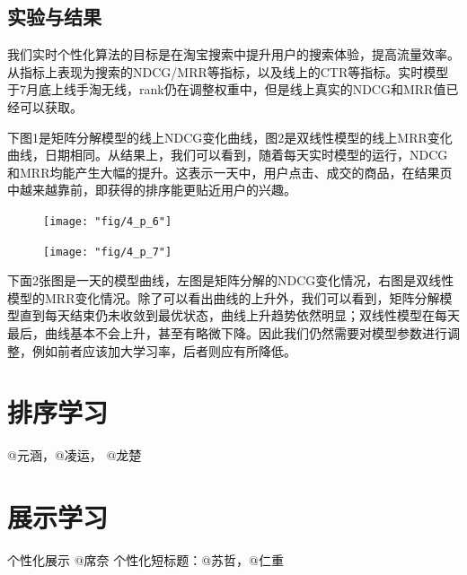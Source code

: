 \subsection{实验与结果} 

我们实时个性化算法的目标是在淘宝搜索中提升用户的搜索体验，提高流量效率。从指标上表现为搜索的NDCG/MRR等指标，以及线上的CTR等指标。实时模型于7月底上线手淘无线，rank仍在调整权重中，但是线上真实的NDCG和MRR值已经可以获取。

  下图1是矩阵分解模型的线上NDCG变化曲线，图2是双线性模型的线上MRR变化曲线，日期相同。从结果上，我们可以看到，随着每天实时模型的运行，NDCG和MRR均能产生大幅的提升。这表示一天中，用户点击、成交的商品，在结果页中越来越靠前，即获得的排序能更贴近用户的兴趣。

 \begin{figure}[h]
	\centering
	\texttt{[image: "fig/4\_p\_6"]}
\end{figure}

 \begin{figure}[h]
	\centering
	\texttt{[image: "fig/4\_p\_7"]}
\end{figure}

下面2张图是一天的模型曲线，左图是矩阵分解的NDCG变化情况，右图是双线性模型的MRR变化情况。除了可以看出曲线的上升外，我们可以看到，矩阵分解模型直到每天结束仍未收敛到最优状态，曲线上升趋势依然明显；双线性模型在每天最后，曲线基本不会上升，甚至有略微下降。因此我们仍然需要对模型参数进行调整，例如前者应该加大学习率，后者则应有所降低。
\begin{figure}[tbp]
	\centering
	\label{fig:Price}
\end{figure}

\section{排序学习}
	@元涵，@凌运， @龙楚
	

\section{展示学习}
	个性化展示 @席奈
	个性化短标题：@苏哲，@仁重 


